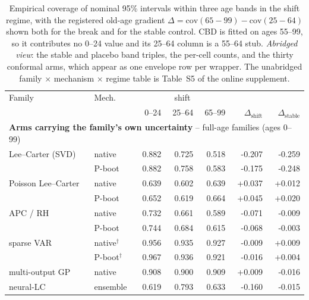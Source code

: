 \begin{table}[tbp]
\centering
\caption{Empirical coverage of nominal 95\% intervals within three age bands in the shift regime, with the registered old-age gradient $\Delta = \mathrm{cov}(65-99) - \mathrm{cov}(25-64)$ shown both for the break and for the stable control. CBD is fitted on ages 55--99, so it contributes no 0--24 value and its 25--64 column is a 55--64 stub. \emph{Abridged view}: the stable and placebo band triples, the per-cell counts, and the thirty conformal arms, which appear as one envelope row per wrapper. The unabridged family $\times$ mechanism $\times$ regime table is Table~S5 of the online supplement.}\label{tab:h4-age-main}
\begin{threeparttable}\scriptsize\renewcommand{\arraystretch}{0.90}\setlength{\tabcolsep}{2.5pt}
\begin{tabular}{@{}llrrrrr@{}}
\toprule
Family & Mech. & \multicolumn{3}{c}{shift} &  &  \\
 &  & 0--24 & 25--64 & 65--99 & $\Delta_{\mathrm{shift}}$ & $\Delta_{\mathrm{stable}}$ \\
\midrule
\multicolumn{7}{l}{\textbf{Arms carrying the family's own uncertainty} -- full-age families (ages 0--99)} \\
\midrule
Lee--Carter (SVD) & native & 0.882 & 0.725 & 0.518 & -0.207 & -0.259 \\
 & P-boot & 0.882 & 0.758 & 0.583 & -0.175 & -0.248 \\
Poisson Lee--Carter & native & 0.639 & 0.602 & 0.639 & +0.037 & +0.012 \\
 & P-boot & 0.652 & 0.619 & 0.664 & +0.045 & +0.020 \\
APC / RH & native & 0.732 & 0.661 & 0.589 & -0.071 & -0.009 \\
 & P-boot & 0.744 & 0.684 & 0.615 & -0.068 & -0.003 \\
sparse VAR & native$^{\dagger}$ & 0.956 & 0.935 & 0.927 & -0.009 & +0.009 \\
 & P-boot$^{\dagger}$ & 0.967 & 0.936 & 0.921 & -0.016 & +0.004 \\
multi-output GP & native & 0.908 & 0.900 & 0.909 & +0.009 & -0.016 \\
neural-LC & ensemble & 0.619 & 0.793 & 0.633 & -0.160 & -0.015 \\

\end{tabular}
\end{threeparttable}
\end{table}
